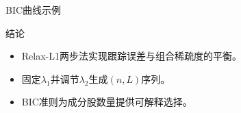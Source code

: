 \documentclass[UTF8]{ctexbeamer}
\begin{document}
\begin{frame}{BIC曲线示例}
  \begin{figure}
    \centering
    
  \end{figure}
\end{frame}

\begin{frame}{结论}
  \begin{itemize}
    \item Relax-L1两步法实现跟踪误差与组合稀疏度的平衡。
    \item 固定$\lambda_1$并调节$\lambda_2$生成$(n,L)$序列。
    \item BIC准则为成分股数量提供可解释选择。
  \end{itemize}
\end{frame}
\end{document}

